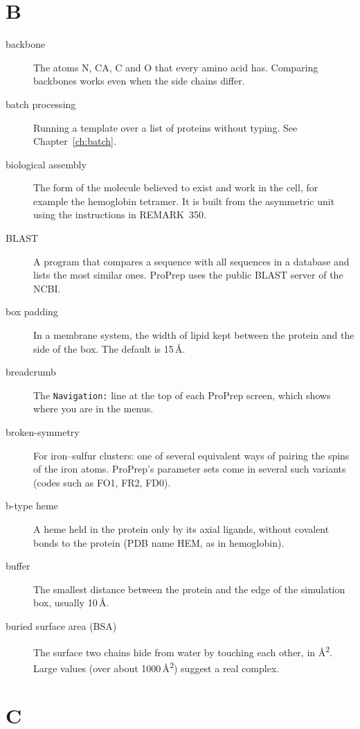 \section*{B}

\begin{description}
\item[backbone] The atoms N, CA, C and O that every amino acid has. Comparing
  backbones works even when the side chains differ.
\item[batch processing] Running a template over a list of proteins without
  typing. See Chapter~\ref{ch:batch}.
\item[biological assembly] The form of the molecule believed to exist and work
  in the cell, for example the hemoglobin tetramer. It is built from the
  asymmetric unit using the instructions in REMARK~350.
\item[BLAST] A program that compares a sequence with all sequences in a
  database and lists the most similar ones. ProPrep uses the public BLAST
  server of the NCBI.
\item[box padding] In a membrane system, the width of lipid kept between the
  protein and the side of the box. The default is 15\,Å.
\item[breadcrumb] The \texttt{Navigation:} line at the top of each ProPrep
  screen, which shows where you are in the menus.
\item[broken-symmetry] For iron--sulfur clusters: one of several equivalent
  ways of pairing the spins of the iron atoms. ProPrep's parameter sets come
  in several such variants (codes such as FO1, FR2, FD0).
\item[b-type heme] A heme held in the protein only by its axial ligands,
  without covalent bonds to the protein (PDB name HEM, as in hemoglobin).
\item[buffer] The smallest distance between the protein and the edge of the
  simulation box, usually 10\,Å.
\item[buried surface area (BSA)] The surface two chains hide from water by
  touching each other, in Å\textsuperscript{2}. Large values (over about
  1000\,Å\textsuperscript{2}) suggest a real complex.
\end{description}

\section*{C}

